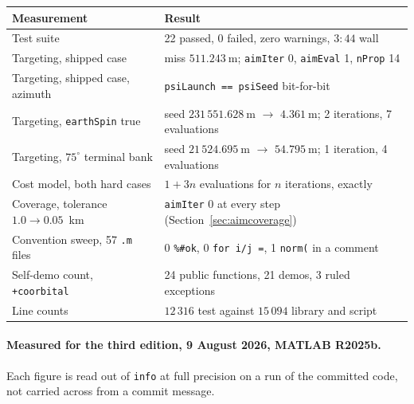 \documentclass[11pt]{article}
\newcommand{\code}[1]{\texttt{#1}}
\newcommand{\pkg}[1]{\texttt{+#1}}
\begin{document}
\begin{center}
\begin{tabular}{ll}
\toprule
Measurement & Result \\
\midrule
Test suite                                & 22 passed, 0 failed, zero warnings, $3{:}44$ wall \\
Targeting, shipped case                   & miss $511.243~\mathrm{m}$; \code{aimIter} 0, \code{aimEval} 1, \code{nProp} 14 \\
Targeting, shipped case, azimuth          & \code{psiLaunch == psiSeed} bit-for-bit \\
Targeting, \code{earthSpin} true          & seed $231\,551.628~\mathrm{m}$ $\to$ $4.361~\mathrm{m}$; 2 iterations, 7 evaluations \\
Targeting, $75^\circ$ terminal bank       & seed $21\,524.695~\mathrm{m}$ $\to$ $54.795~\mathrm{m}$; 1 iteration, 4 evaluations \\
Cost model, both hard cases               & $1 + 3n$ evaluations for $n$ iterations, exactly \\
Coverage, tolerance $1.0 \to 0.05$~km     & \code{aimIter} 0 at every step (Section~\ref{sec:aimcoverage}) \\
Convention sweep, 57 \code{.m} files      & 0 \code{\%\#ok}, 0 \code{for i/j =}, 1 \code{norm(} in a comment \\
Self-demo count, \pkg{coorbital}          & 24 public functions, 21 demos, 3 ruled exceptions \\
Line counts                               & $12\,316$ test against $15\,094$ library and script \\
\bottomrule
\end{tabular}
\end{center}

\paragraph{Measured for the third edition, 9 August 2026, MATLAB R2025b.} Each
figure is read out of \code{info} at full precision on a run of the committed
code, not carried across from a commit message.
\end{document}
